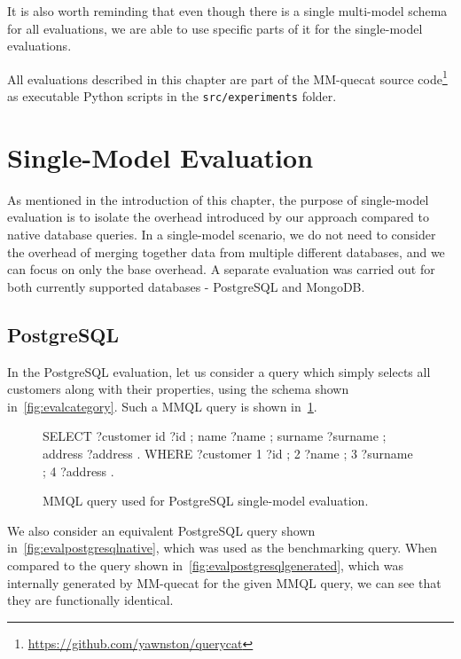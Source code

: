 It is also worth reminding that even though there is a single multi-model schema for all evaluations, we are able to use specific parts of it for the single-model evaluations.

All evaluations described in this chapter are part of the MM-quecat source code\footnote{\url{https://github.com/yawnston/querycat}} as executable Python scripts in the \texttt{src/experiments} folder.

\section{Single-Model Evaluation}

As mentioned in the introduction of this chapter, the purpose of single-model evaluation is to isolate the overhead introduced by our approach compared to native database queries.
In a single-model scenario, we do not need to consider the overhead of merging together data from multiple different databases, and we can focus on only the base overhead.
A separate evaluation was carried out for both currently supported databases - PostgreSQL and MongoDB.

\subsection{PostgreSQL}
\label{eval:subsection:postgresql}

In the PostgreSQL evaluation, let us consider a query which simply selects all customers along with their properties, using the schema shown in~\cref{fig:evalcategory}.
Such a MMQL query is shown in~\cref{fig:evalpostgresqlmmql}.

\begin{figure}[ht]
\begin{code}
SELECT {
    ?customer id ?id ;
        name ?name ;
        surname ?surname ;
        address ?address .
}
WHERE {
    ?customer 1 ?id ;
        2 ?name ;
        3 ?surname ;
        4 ?address .
}
\end{code}
\caption{MMQL query used for PostgreSQL single-model evaluation.}\label{fig:evalpostgresqlmmql}
\end{figure}

We also consider an equivalent PostgreSQL query shown in~\cref{fig:evalpostgresqlnative}, which was used as the benchmarking query.
When compared to the query shown in~\cref{fig:evalpostgresqlgenerated}, which was internally generated by MM-quecat for the given MMQL query, we can see that they are functionally identical.


